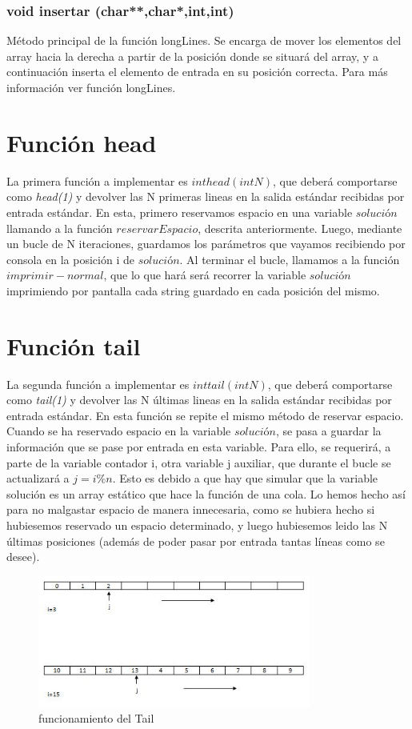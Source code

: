 \subsubsection{void insertar (char**,char*,int,int)}
Método principal de la función longLines. Se encarga de mover los elementos del array hacia la derecha a partir de la posición donde se situará  del array, y a continuación inserta el elemento de entrada en su posición correcta. Para más información ver función longLines. 
\section{Función head}
La primera función a implementar es $int head(int N)$, que deberá comportarse como \textit{head(1)} y devolver las N primeras lineas en la salida estándar recibidas por entrada estándar.
En esta, primero reservamos espacio en una variable $solución$ llamando a la función $reservarEspacio$, descrita anteriormente. Luego, mediante un bucle de N iteraciones, guardamos los parámetros que vayamos recibiendo por consola en la posición i de $solución$.
Al terminar el bucle, llamamos a la función $imprimir-normal$, que lo que hará será recorrer la variable $solución$ imprimiendo por pantalla cada string guardado en cada posición del mismo.
\section{Función tail}
La segunda función a implementar es $int tail(int N)$, que deberá comportarse como \textit{tail(1)} y devolver las N últimas lineas en la salida estándar recibidas por entrada estándar.
En esta función se repite el mismo método de reservar espacio. Cuando se ha reservado espacio en la variable $solución$, se pasa a guardar la información que se pase por entrada en esta variable. Para ello, se requerirá, a parte de la variable contador i, otra variable j auxiliar, que durante el bucle se actualizará a $j=i\%n$. Esto es debido a que hay que simular que la variable solución es un array estático que hace la función de una cola. Lo hemos hecho así para no malgastar espacio de manera innecesaria, como se hubiera hecho si hubiesemos reservado un espacio determinado, y luego hubiesemos leido las N últimas posiciones (además de poder pasar por entrada tantas líneas como se desee).
\begin{figure}[htb]
\begin{center}
\centering
  \includegraphics[width=0.8\textwidth]{./img_1}
  \caption{funcionamiento del Tail}
  \label{fig:Funcionamiento del Tail}
\end{center}
\end{figure} 

